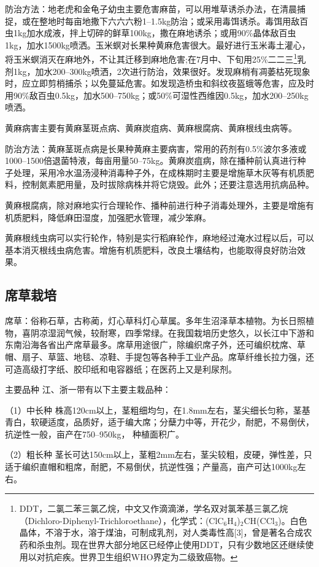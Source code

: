 \documentclass{ctexbook}
\begin{document}
防治方法：地老虎和金龟子幼虫主要危害麻苗，可以用堆草诱杀办法，在清晨捕捉，或在整地时每亩地撒下六六六粉1--1.5kg防治；或采用毒饵诱杀。毒饵用敌百虫1kg加水成液，拌上切碎的鲜草100kg，撒在麻地诱杀；或用90\%晶体敌百虫1kg，加水1500kg喷洒。玉米螟对长果种黄麻危害很大。最好进行玉米毒土灌心，将玉米螟消灭在麻地外，不让其迁移到麻地危害;在7月中、下旬用25\%二二三\footnote{DDT，二氯二苯三氯乙烷，中文又作滴滴涕，学名双对氯苯基三氯乙烷（Dichloro-Diphenyl-Trichloroethane），化学式：(ClC$_6$H$_4$)$_2$CH(CCl$_3$)。白色晶体，不溶于水，溶于煤油，可制成乳剂，对人类毒性高[3]，曾是著名合成农药和杀虫剂。现在世界大部分地区已经停止使用DDT，只有少数地区还继续使用以对抗疟疾。世界卫生组织WHO界定为二级致癌物。}乳剂1kg，加水200--300kg喷洒，2次进行防治，效果很好。发现麻梢有凋萎枯死现象时，应立即剪梢捕杀；以免蔓延危害。如发现造桥虫和斜纹夜盔蛾等危害，应及时用90\%敌百虫0.5kg，加水500--750kg；或50\%可湿性西维因0.5kg，加水200--250kg喷洒。

黄麻病害主要有黄麻茎斑点病、黄麻炭疽病、黄麻根腐病、黄麻根线虫病等。

防治方法：黄麻茎斑点病是长果种黄麻主要病害，常用的药剂有0.5\%波尔多液或1000--1500倍退菌特液，每亩用量50--75kg。黄麻炭疽病，除在播种前认真进行种子处理，采用冷水温汤浸种消毒种子外，在成株期时主要是增施草木灰等有机质肥料，控制氮素肥用量，及时拔除病株并将它烧毁。此外；还要注意选用抗病品种。

黄麻根腐病，除对麻地实行合理轮作、播种前进行种子消毒处理外，主要是增施有机质肥料，降低麻田湿度，加强肥水管理，减少笨麻。

黄麻根线虫病可以实行轮作，特别是实行稻麻轮作，麻地经过淹水过程以后，可以基本消灭根线虫病危害。增施有机质肥料，改良土壤结构，也能取得良好防治效果。
\subsection{席草栽培}
席草：俗称石草，古称蔺，灯心草科灯心草属。多年生沼泽草本植物。为长日照植物，喜阴凉湿润气候，较耐寒，四季常绿。在我国栽培历史悠久，以长江中下游和东南沿海各省出产席草最多。席草用途很广，除编织席子外，还可编织枕席、草帽、扇子、草篮、地毯、凉鞋、手提包等各种手工业产品。席草纤维长拉力强，还可造高级打字纸、胶印纸和电容器纸；在医药上又是利尿剂。

主要品种 江、浙一带有以下主要主栽品种：

（1）中长种 株高120cm以上，茎粗细均匀，在1.8mm左右，茎尖细长匀称，茎基青白，软硬适度，品质好，适于编大席；分蘖力中等，开花少，耐肥，不易倒伏，抗逆性一般，亩产在750--950kg，
种植面积广。

（2）粗长种 茎长可达150cm以上，茎粗2mm左右，茎尖较粗，皮硬，弹性差，只适于编织直帽和粗席，耐肥，不易倒伏，抗逆性强；产量高，亩产可达1000kg左右。
\end{document}
